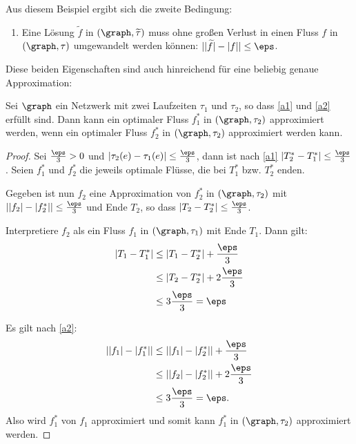 Aus diesem Beispiel ergibt sich die zweite Bedingung:
\begin{framed}
\begin{enumerate}[start=2, label={(A\arabic*)}]
    \item Eine Lösung $\widetilde{f}$ in $(\graph, \widetilde{\tau})$ muss
        ohne großen Verlust in einen Fluss $f$ in $(\graph, \tau)$
        umgewandelt werden können: $||\widetilde{f}| - |f|| \leq \eps$.
        \label{a2}
\end{enumerate}
\end{framed}

Diese beiden Eigenschaften sind auch hinreichend für eine beliebig genaue
Approximation:
\begin{corollary}
    Sei $\graph$ ein Netzwerk mit zwei Laufzeiten $\tau_1$ und $\tau_2$, so dass
    \ref{a1} und \ref{a2} erfüllt sind.
    Dann kann ein optimaler Fluss $f_1^*$ in $(\graph, \tau_2)$ approximiert werden,
    wenn ein optimaler Fluss $f_2^*$ in $(\graph, \tau_2)$ approximiert werden kann.

    \begin{proof}    
        Sei $\frac{\eps}{3} > 0$ und $|\tau_2(e) - \tau_1(e)| \leq \frac{\eps}{3}$,
        dann ist nach \ref{a1} $|T_2^* - T_1^*| \leq \frac{\eps}{3}$.
        Seien $f_1^*$ und $f_2^*$ die jeweils optimale Flüsse, die bei
        $T_1^*$ bzw. $T_2^*$ enden.

        Gegeben ist nun $f_2$ eine Approximation von $f_2^*$ in $(\graph, \tau_2)$
        mit $||f_2| - |f_2^*|| \leq \frac{\eps}{3}$ und Ende $T_2$, so dass
        $|T_2 - T_2^*| \leq \frac{\eps}{3}$.

        Interpretiere $f_2$ als ein Fluss $f_1$ in $(\graph, \tau_1)$
        mit Ende $T_1$. Dann gilt:
        \begin{align*}
            |T_1 - T_1^*| & \leq |T_1 - T_2^*| + \frac{\eps}{3} \\
                & \leq |T_2 - T_2^*| + 2 \frac{\eps}{3} \\
                & \leq 3 \frac{\eps}{3} = \eps
        \end{align*}

        Es gilt nach \ref{a2}:
        \begin{align*}
            ||f_1| - |f_1^*|| & \leq ||f_1| - |f_2^*|| + \frac{\eps}{3} \\
                            & \leq ||f_2| - |f_2^*|| + 2 \frac{\eps}{3} \\
                            & \leq 3 \frac{\eps}{3} = \eps.
        \end{align*}
        Also wird $f_1^*$ von $f_1$ approximiert und somit kann
        $f_1^*$ in $(\graph, \tau_2)$ approximiert werden.
    \end{proof}
\end{corollary}



